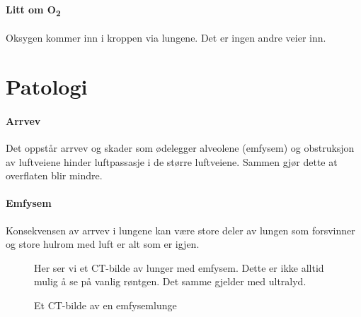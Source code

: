 				\paragraph{Litt om O\textsubscript{2}\\}
					Oksygen kommer inn i kroppen via lungene. Det er ingen andre veier inn. 
		\section{Patologi}
			\paragraph{Arrvev\\}
				Det oppstår arrvev og skader som ødelegger alveolene (emfysem) og obstruksjon av luftveiene hinder luftpassasje i de større luftveiene. Sammen gjør dette at overflaten blir mindre.
			\paragraph{Emfysem\\}
				Konsekvensen av arrvev i lungene kan være store deler av lungen som forsvinner og store hulrom med luft er alt som er igjen. 
					\begin{figure}[ht]
                      \centering
                      \caption{Et CT-bilde av en emfysemlunge}
                      {Her ser vi et CT-bilde av lunger med emfysem. Dette er ikke alltid mulig å se på vanlig røntgen. Det samme gjelder med ultralyd.}%
                    \end{figure}
